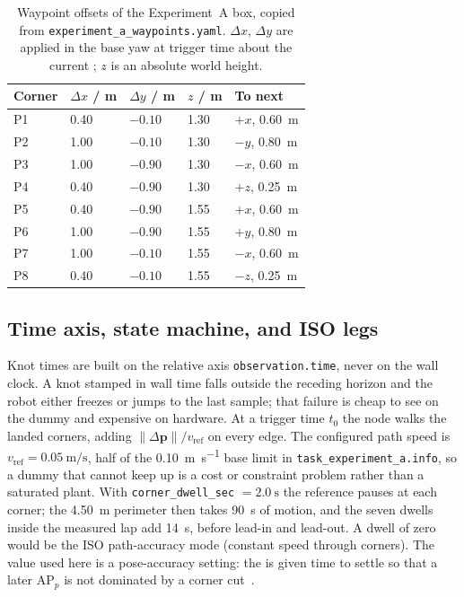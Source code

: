 \begin{table}[htbp]
  \centering
  \caption[Waypoint offsets of the Experiment~A box]{%
    Waypoint offsets of the Experiment~A box, copied from
    \texttt{experiment\_a\_waypoints.yaml}. $\Delta x$, $\Delta y$ are
    applied in the base yaw at trigger time about the current \ee{};
    $z$ is an absolute world height.}
  \label{tab:sim-waypoints}
  \begin{tabularx}{\linewidth}{@{}lXXXX@{}}
    \toprule
    Corner & $\Delta x$ / \si{\meter} & $\Delta y$ / \si{\meter}
      & $z$ / \si{\meter} & To next \\
    \midrule
    P1 & 0.40 & $-0.10$ & 1.30 & $+x$, \qty{0.60}{\meter} \\
    P2 & 1.00 & $-0.10$ & 1.30 & $-y$, \qty{0.80}{\meter} \\
    P3 & 1.00 & $-0.90$ & 1.30 & $-x$, \qty{0.60}{\meter} \\
    P4 & 0.40 & $-0.90$ & 1.30 & $+z$, \qty{0.25}{\meter} \\
    P5 & 0.40 & $-0.90$ & 1.55 & $+x$, \qty{0.60}{\meter} \\
    P6 & 1.00 & $-0.90$ & 1.55 & $+y$, \qty{0.80}{\meter} \\
    P7 & 1.00 & $-0.10$ & 1.55 & $-x$, \qty{0.60}{\meter} \\
    P8 & 0.40 & $-0.10$ & 1.55 & $-z$, \qty{0.25}{\meter} \\
    \bottomrule
  \end{tabularx}
\end{table}

\subsection{Time axis, state machine, and ISO legs}
\label{sec:sim-node}

Knot times are built on the \ocs{} relative axis
\texttt{observation.time}, never on the wall clock. A knot stamped in
wall time falls outside the receding horizon and the robot either freezes
or jumps to the last sample; that failure is cheap to see on the dummy
and expensive on hardware. At a trigger time $t_{0}$ the node walks the
landed corners, adding $\lVert \Delta\symbf{p}\rVert / v_{\mathrm{ref}}$
on every edge. The configured path speed is
$v_{\mathrm{ref}} = \qty{0.05}{\meter\per\second}$, half of the
\qty{0.10}{\meter\per\second} base limit in
\texttt{task\_experiment\_a.info}, so a dummy that cannot keep up is a
cost or constraint problem rather than a saturated plant. With
\texttt{corner\_dwell\_sec} $= \qty{2.0}{\second}$ the reference pauses
at each corner; the \qty{4.50}{\meter} perimeter then takes
\qty{90}{\second} of motion, and the seven dwells inside the measured
lap add \qty{14}{\second}, before lead-in and lead-out. A dwell of zero would
be the ISO path-accuracy mode (constant speed through corners). The
value used here is a pose-accuracy setting: the \ee{} is given time to
settle so that a later $\mathrm{AP}_{p}$ is not dominated by a corner
cut~\cite{ISO9283}.

